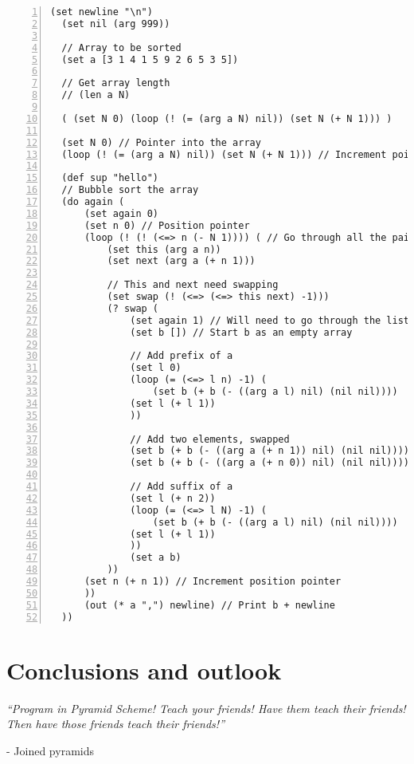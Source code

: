\documentclass[aip,jcp,reprint]{revtex4-1}
\begin{document}
\begin{lstlisting}[language=psll,frame=tb,numbers=left,aboveskip=3mm,belowskip=3mm]
  (set newline "\n")
  (set nil (arg 999))
  
  // Array to be sorted
  (set a [3 1 4 1 5 9 2 6 5 3 5])
  
  // Get array length
  // (len a N)
  
  ( (set N 0) (loop (! (= (arg a N) nil)) (set N (+ N 1))) )
  
  (set N 0) // Pointer into the array
  (loop (! (= (arg a N) nil)) (set N (+ N 1))) // Increment pointer until goes off the end
  
  (def sup "hello")
  // Bubble sort the array
  (do again (
      (set again 0)
      (set n 0) // Position pointer
      (loop (! (! (<=> n (- N 1)))) ( // Go through all the pairs
          (set this (arg a n))
          (set next (arg a (+ n 1)))
  
          // This and next need swapping
          (set swap (! (<=> (<=> this next) -1)))
          (? swap (
              (set again 1) // Will need to go through the list again
              (set b []) // Start b as an empty array
              
              // Add prefix of a
              (set l 0)
              (loop (= (<=> l n) -1) (
                  (set b (+ b (- ((arg a l) nil) (nil nil))))
              (set l (+ l 1))
              ))
  
              // Add two elements, swapped
              (set b (+ b (- ((arg a (+ n 1)) nil) (nil nil))))
              (set b (+ b (- ((arg a (+ n 0)) nil) (nil nil))))
  
              // Add suffix of a
              (set l (+ n 2))
              (loop (= (<=> l N) -1) (
                  (set b (+ b (- ((arg a l) nil) (nil nil))))
              (set l (+ l 1))
              ))
              (set a b)
          ))
      (set n (+ n 1)) // Increment position pointer
      ))
      (out (* a ",") newline) // Print b + newline
  ))
\end{lstlisting}

\section{Conclusions and outlook}
\textit{\enquote{Program in Pyramid Scheme! Teach your friends! Have them teach \emph{their} friends! Then have those friends teach \emph{their} friends!}}

- Joined pyramids
\end{document}
